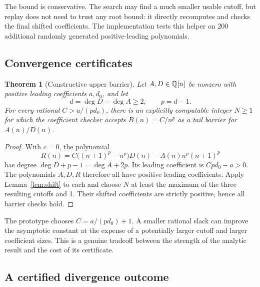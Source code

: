 \documentclass[11pt,a4paper]{article}
\newtheorem{theorem}{Theorem}[section]
\theoremstyle{definition}\newtheorem{definition}[theorem]{Definition}
\begin{document}
The bound is conservative. The search may find a much smaller usable cutoff,
but replay does not need to trust any root bound: it directly recomputes and
checks the final shifted coefficients. The implementation tests this helper
on 200 additional randomly generated positive-leading polynomials.

\subsection{Convergence certificates}

\begin{theorem}[Constructive upper barrier]\label{thm:constructive}
Let $A,D\in\mathbb Q[n]$ be nonzero with positive leading coefficients $a,d_0$,
and let
\[
 d=\deg D-\deg A\ge2,\qquad p=d-1.
\]
For every rational $C>a/(p d_0)$, there is an explicitly computable integer
$N\ge1$ for which the coefficient checker accepts
$B(n)=C/n^p$ as a tail barrier for $A(n)/D(n)$.
\end{theorem}
\begin{proof}
With $c=0$, the polynomial
\[
 R(n)=C\bigl((n+1)^p-n^p\bigr)D(n)-A(n)n^p(n+1)^p
\]
has degree $\deg D+p-1=\deg A+2p$. Its leading coefficient is
$C p d_0-a>0$. The polynomials $A,D,R$ therefore all have positive leading
coefficients. Apply Lemma~\ref{lem:shift} to each and choose $N$ at least the
maximum of the three resulting cutoffs and 1. Their shifted coefficients are
strictly positive, hence all barrier checks hold.
\end{proof}

The prototype chooses $C=a/(p d_0)+1$. A smaller rational slack can improve the
asymptotic constant at the expense of a potentially larger cutoff and larger
coefficient sizes. This is a genuine tradeoff between the strength of the
analytic result and the cost of its certificate.

\subsection{A certified divergence outcome}
\end{document}
